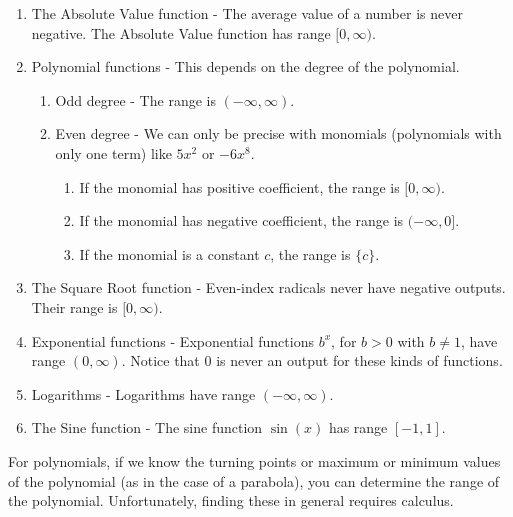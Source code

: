 \documentclass[nooutcomes]{ximera}
\begin{document}
	\begin{callout}
		\begin{enumerate}	
			\item The Absolute Value function - The average value of a number is never negative. The Absolute Value function has range $[0, \infty)$.
	
			\item Polynomial functions -  This depends on the degree of the polynomial.
				\begin{enumerate}
					\item Odd degree - The range is $(-\infty, \infty)$.
					\item Even degree - We can only be precise with monomials (polynomials with only one term) like $5x^2$ or $-6x^8$. 
						\begin{enumerate}
							\item If the monomial has positive coefficient, the range is $[0, \infty)$.
							\item If the monomial has negative coefficient, the range is $(-\infty, 0]$.
							\item If the monomial is a constant $c$, the range is $\{c\}$. 
						\end{enumerate}
				\end{enumerate}
					
			\item The Square Root function - Even-index radicals never have negative outputs. Their range is $[0, \infty)$.		
	
			\item Exponential functions - Exponential functions $b^x$, for $b >0$ with $b \neq 1$,  have range $(0, \infty)$. Notice that $0$ is
					never an output for these kinds of functions.
	
			\item Logarithms - Logarithms have range $(-\infty, \infty)$.
				
			\item The Sine function - The sine function $\sin(x)$ has range $[-1,1]$.
		\end{enumerate}
	\end{callout}

	\begin{remark}
	For polynomials, if we know the turning points or maximum or minimum values of the polynomial (as in the case of a parabola), you can determine the range of the polynomial. 				Unfortunately, finding these in general requires calculus. 
	\end{remark}
\end{document}
